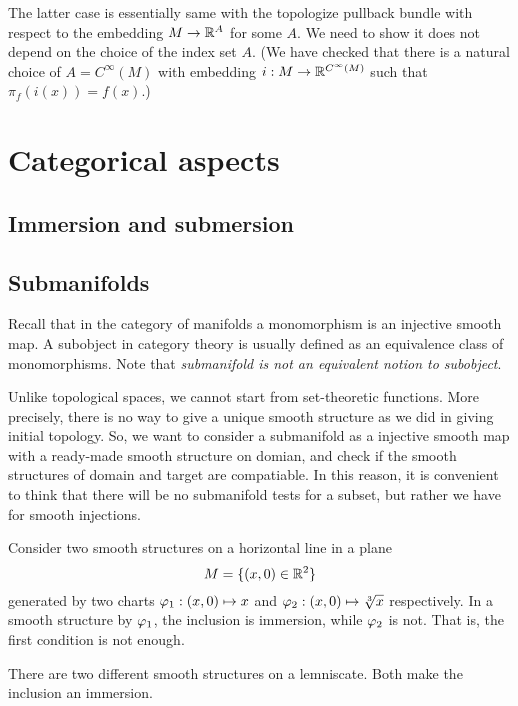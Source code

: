 \documentclass{../note}
\begin{document}
The latter case is essentially same with the topologize pullback bundle with respect to the embedding $M\to\mathbb{R}^A$ for some $A$.
We need to show it does not depend on the choice of the index set $A$.
(We have checked that there is a natural choice of $A=C^\infty(M)$ with embedding $i:M\to\mathbb{R}^{C^\infty(M)}$ such that $\pi_f(i(x))=f(x)$.)










\chapter{Categorical aspects}

\section{Immersion and submersion}

\section{Submanifolds}

Recall that in the category of manifolds a monomorphism is an injective smooth map.
A subobject in category theory is usually defined as an equivalence class of monomorphisms.
Note that \emph{submanifold is not an equivalent notion to subobject}.





Unlike topological spaces, we cannot start from set-theoretic functions.
More precisely, there is no way to give a unique smooth structure as we did in giving initial topology.
So, we want to consider a submanifold as a injective smooth map with a ready-made smooth structure on domian, and check if the smooth structures of domain and target are compatiable.
In this reason, it is convenient to think that there will be no submanifold tests for a subset, but rather we have for smooth injections.
\begin{ex}
Consider two smooth structures on a horizontal line in a plane
\[M=\{(x,0)\in\mathbb{R}^2\}\]
generated by two charts $\varphi_1:(x,0)\mapsto x$ and $\varphi_2:(x,0)\mapsto\sqrt[3]{x}$ respectively.
In a smooth structure by $\varphi_1$, the inclusion is immersion, while $\varphi_2$ is not.
That is, the first condition is not enough.
\end{ex}
\begin{ex}
There are two different smooth structures on a lemniscate.
Both make the inclusion an immersion.
\end{ex}
\end{document}

